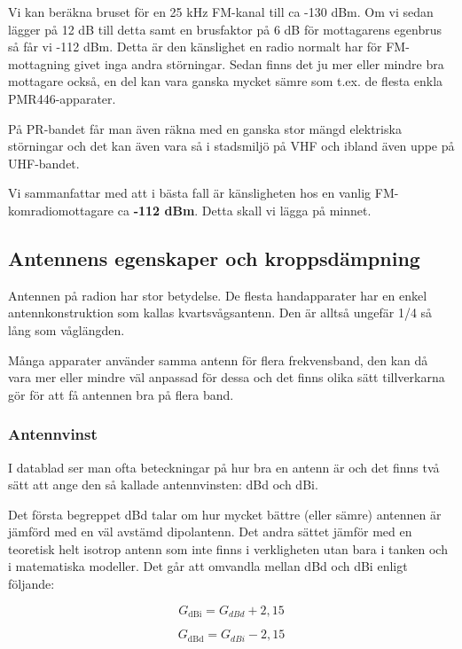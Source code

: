 Vi kan beräkna bruset för en 25 kHz FM-kanal till ca -130 dBm. Om vi sedan lägger på 12 dB till detta samt en brusfaktor på 6 dB för mottagarens egenbrus så får vi -112 dBm. Detta är den känslighet en radio normalt har för FM-mottagning givet inga andra störningar. Sedan finns det ju mer eller mindre bra mottagare också, en del kan vara ganska mycket sämre som t.ex. de flesta enkla PMR446-apparater.

På PR-bandet får man även räkna med en ganska stor mängd elektriska störningar och det kan även vara så i stadsmiljö på VHF och ibland även uppe på UHF-bandet.

Vi sammanfattar med att i bästa fall är känsligheten hos en vanlig FM-kom\-ra\-di\-o\-mot\-ta\-ga\-re ca \textbf{-112 dBm}. Detta skall vi lägga på minnet.

\subsection{Antennens egenskaper och kroppsdämpning}

Antennen på radion har stor betydelse. De flesta handapparater har en enkel antennkonstruktion som kallas kvartsvågsantenn. Den är alltså ungefär 1/4 så lång som våglängden. 

Många apparater använder samma antenn för flera frekvensband, den kan då vara mer eller mindre väl anpassad för dessa och det finns olika sätt tillverkarna gör för att få antennen bra på flera band.

\subsubsection{Antennvinst}

I datablad ser man ofta beteckningar på hur bra en antenn är och det finns två sätt att ange den så kallade antennvinsten: dBd och dBi.

Det första begreppet dBd talar om hur mycket bättre (eller sämre) antennen är jämförd med en väl avstämd dipolantenn. Det andra sättet jämför med en teoretisk helt isotrop antenn som inte finns i verkligheten utan bara i tanken och i matematiska modeller. Det går att omvandla mellan dBd och dBi enligt följande:

\begin{equation}
G_{\mathrm{dBi}} = G_{dBd} + 2,15
\end{equation}

\begin{equation}
G_{\mathrm{dBd}} = G_{dBi} - 2,15
\end{equation}

